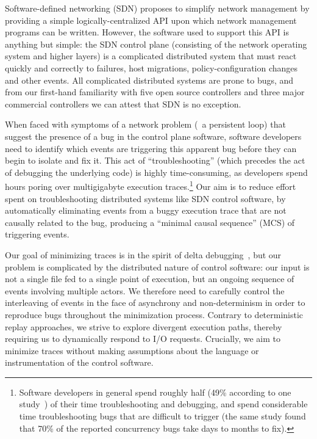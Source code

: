 Software-defined networking (SDN) proposes to simplify network management by
providing a simple logically-centralized API upon which network management
programs can be written. However, the software used to support this API is
anything but simple: the SDN control plane (consisting of the network
operating system and higher layers) is a complicated distributed system that
must react quickly and correctly to failures, host migrations,
policy-configuration changes and other events.
All complicated distributed systems are prone to bugs, and from our first-hand
familiarity with five open source controllers and three major commercial
controllers we can attest that SDN is no exception.

When faced with symptoms of a network problem (\eg~a persistent loop)
that suggest the presence of a bug in the control plane software,
software developers need to identify which events are triggering
this apparent bug before they can begin to isolate and fix it.
This act of ``troubleshooting'' (which precedes the act of debugging the
underlying code) is highly time-consuming, as developers spend hours poring
over multigigabyte execution traces.\footnote{Software developers in general spend roughly half (49\% according to one
study~\cite{msoft_concurrency}) of their time troubleshooting and debugging, and spend
considerable time troubleshooting bugs that are difficult to trigger (the same study found
that 70\% of the reported concurrency bugs take days to months to fix).}
Our aim is to reduce effort spent on troubleshooting distributed systems like
SDN control software, by automatically eliminating
events from a buggy execution trace that are not causally related to the bug, producing a ``minimal
causal sequence'' (MCS) of triggering events.

Our goal of minimizing traces is in the spirit of
delta debugging~\cite{Zeller:1999:YMP:318773.318946}, but our problem is
complicated by the distributed nature of control software:
our input is not a single file fed to a single point of execution, but an ongoing
sequence of events involving
multiple actors. We therefore need to carefully
control the interleaving of events in the face of asynchrony and non-determinism in
order to reproduce bugs throughout the minimization process.
Contrary to deterministic replay
approaches, we strive to explore divergent execution paths, thereby requiring
us to dynamically respond to I/O requests. Crucially, we aim to minimize traces without making assumptions about the language
or instrumentation of the control software.

